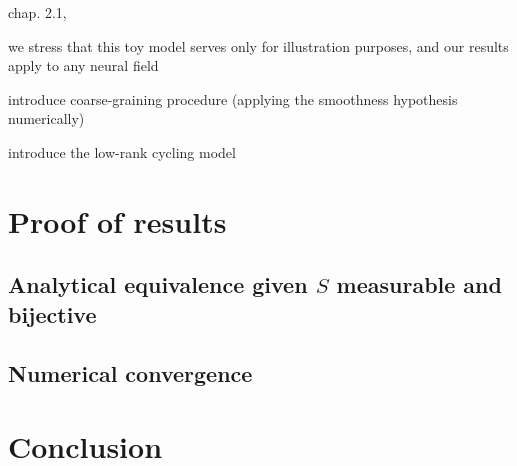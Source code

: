 \documentclass[10pt,letterpaper]{article}
\begin{document}
chap. 2.1, 

we stress that this toy model serves only for illustration purposes, and our results apply to any neural field

introduce coarse-graining procedure (applying the smoothness hypothesis numerically)

introduce the low-rank cycling model

\section{Proof of results}

\subsection{Analytical equivalence given $S$ measurable and bijective}
\label{sec:proof-equivalence}

\subsection{Numerical convergence}

\section{Conclusion}




\end{document}
